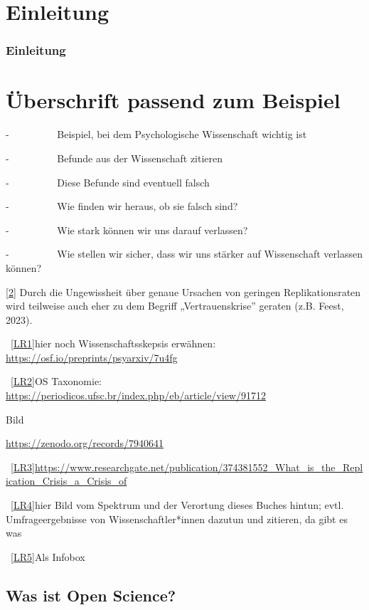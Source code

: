 \documentclass[
  letterpaper,
  DIV=11,
  numbers=noendperiod]{scrreprt}
\begin{document}
\part{Einleitung}

\section*{Einleitung}\label{einleitung-1}


\part{Überschrift passend zum Beispiel}

-~~~~~~~~~ Beispiel, bei dem Psychologische Wissenschaft wichtig ist

-~~~~~~~~~ Befunde aus der Wissenschaft zitieren

-~~~~~~~~~ Diese Befunde sind eventuell falsch

-~~~~~~~~~ Wie finden wir heraus, ob sie falsch sind?

-~~~~~~~~~ Wie stark können wir uns darauf verlassen?

-~~~~~~~~~ Wie stellen wir sicher, dass wir uns stärker auf Wissenschaft
verlassen können?

\hyperref[_ftnref2]{{[}2{]}} Durch die Ungewissheit über genaue Ursachen
von geringen Replikationsraten wird teilweise auch eher zu dem Begriff
„Vertrauenskrise'' geraten (z.B. Feest, 2023).

~\hyperref[_msoanchor_1]{{[}LR1{]}}hier noch Wissenschaftsskepsis
erwähnen: \url{https://osf.io/preprints/psyarxiv/7u4fg} ~

~\hyperref[_msoanchor_2]{{[}LR2{]}}OS Taxonomie:
\url{https://periodicos.ufsc.br/index.php/eb/article/view/91712}

Bild

\url{https://zenodo.org/records/7940641}

~\hyperref[_msoanchor_3]{{[}LR3{]}}\url{https://www.researchgate.net/publication/374381552_What_is_the_Replication_Crisis_a_Crisis_of}

~\hyperref[_msoanchor_4]{{[}LR4{]}}hier Bild vom Spektrum und der
Verortung dieses Buches hintun; evtl. Umfrageergebnisse von
Wissenschaftler*innen dazutun und zitieren, da gibt es was

~\hyperref[_msoanchor_5]{{[}LR5{]}}Als Infobox

\chapter{Was ist Open Science?}\label{was-ist-open-science}
\end{document}
